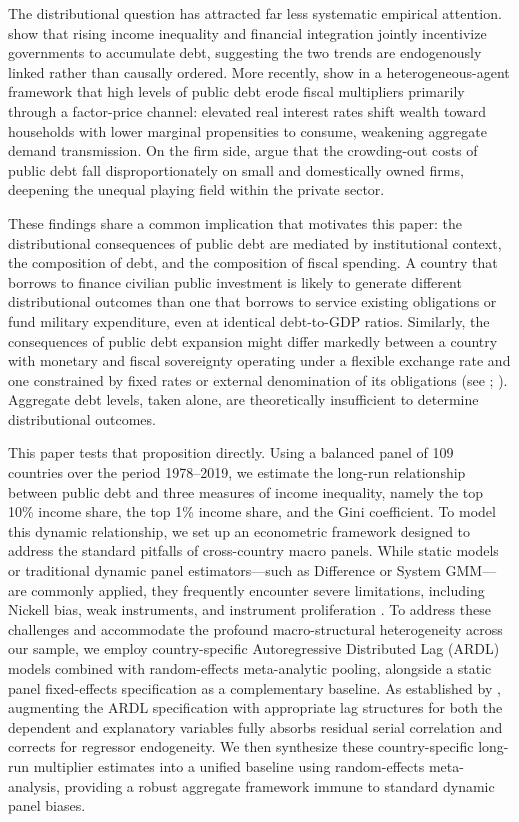 \documentclass[12pt, titlepage]{article}
\numberwithin{equation}{section}
\begin{document}
The distributional question has attracted far less systematic empirical attention. \cite{Azzimonti2014} show that rising income inequality and financial integration jointly incentivize governments to accumulate debt, suggesting the two trends are endogenously linked rather than causally ordered.  More recently, \cite{Grancini2025} show in a heterogeneous-agent framework that high levels of public debt erode fiscal multipliers primarily through a factor-price channel: elevated real interest rates shift wealth toward households with lower marginal propensities to consume, weakening aggregate demand transmission. On the firm side, \cite{Islam2024} argue that the crowding-out costs of public debt fall disproportionately on small and domestically owned firms, deepening the unequal playing field within the private sector.

These findings share a common implication that motivates this paper: the distributional consequences of public debt are mediated by institutional context, the composition of debt, and the composition of fiscal spending. A country that borrows to finance civilian public investment is likely to generate different distributional outcomes than one that borrows to service existing obligations or fund military expenditure, even at identical debt-to-GDP ratios. Similarly, the consequences of public debt expansion might differ markedly between a country with monetary and fiscal sovereignty operating under a flexible exchange rate and one constrained by fixed rates or external denomination of its obligations (see \cite{HarmsKnaze2021}; \cite{IlzetzkiReinhartRogoff2019}). Aggregate debt levels, taken alone, are theoretically insufficient to determine distributional outcomes.


This paper tests that proposition directly. Using a balanced panel of 109
countries over the period 1978--2019, we estimate the long-run relationship
between public debt and three measures of income inequality, namely the top
10\% income share, the top 1\% income share, and the Gini coefficient.
To model this dynamic relationship, we set up an econometric framework designed to address 
the standard pitfalls of cross-country macro panels. While static models or traditional dynamic panel 
estimators—such as Difference or System GMM—are commonly applied, they frequently encounter 
severe limitations, including Nickell bias, weak instruments, and instrument proliferation 
\citep{Roodman2009}. To address these challenges and accommodate the profound macro-structural 
heterogeneity across our sample, we employ country-specific Autoregressive Distributed Lag (ARDL) 
models combined with random-effects meta-analytic pooling, alongside a static panel fixed-effects 
specification as a complementary baseline. As established by \cite{PesaranShin1999}, augmenting the ARDL 
specification with appropriate lag structures for both the dependent and explanatory variables fully 
absorbs residual serial correlation and corrects for regressor endogeneity. We then synthesize these 
country-specific long-run multiplier estimates into a unified baseline using random-effects meta-analysis, 
providing a robust aggregate framework immune to standard dynamic panel biases.
\end{document}
